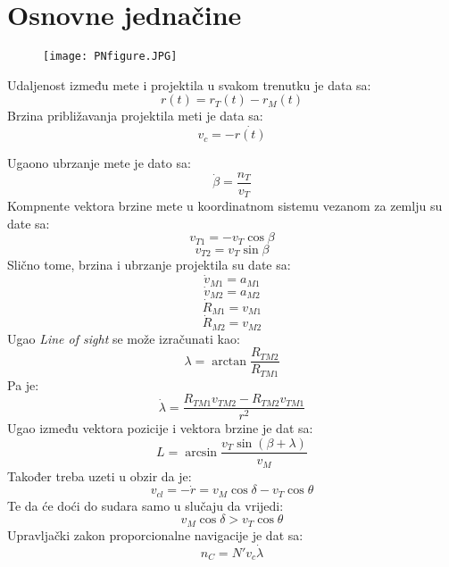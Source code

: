 
\section{Osnovne jednačine}

\begin{figure}[h!]
    \centering
    \texttt{[image: PNfigure.JPG]}
\end{figure}

Udaljenost između mete i projektila u svakom trenutku je data sa:
\begin{equation}
    r(t)=r_T(t)-r_M(t)
\end{equation}
Brzina približavanja projektila meti je data sa: 
\begin{equation}
    v_c=-\dot{r(t)}
\end{equation}

Ugaono ubrzanje mete je dato sa:
\begin{equation}
    \dot{\beta}=\frac{n_T}{v_T}
\end{equation}
Kompnente vektora brzine mete u koordinatnom sistemu vezanom za zemlju su date sa:
\begin{equation}
    v_{T1}=-v_T\cos{\beta}
\end{equation}
\begin{equation}
    v_{T2}=v_T\sin{\beta}
\end{equation}
Slično tome, brzina i ubrzanje projektila su date sa:
\begin{equation}
    \dot{v}_{M1}=a_{M1}
\end{equation}
\begin{equation}
    \dot{v}_{M2}=a_{M2}
\end{equation}
\begin{equation}
    \dot{R}_{M1}=v_{M1}
\end{equation}
\begin{equation}
    \dot{R}_{M2}=v_{M2}
\end{equation}
Ugao \textit{Line of sight} se može izračunati kao:
\begin{equation}
    \lambda = \arctan{\frac{R_{TM2}}{R_{TM1}}}
\end{equation}
Pa je: 
\begin{equation}
    \dot{\lambda}=\frac{R_{TM1}v_{TM2}-R_{TM2}v_{TM1}}{r^2}
\end{equation}
Ugao između vektora pozicije i vektora brzine je dat sa:
\begin{equation}
    L=\arcsin{\frac{v_T\sin{(\beta+\lambda)}}{v_M}}
\end{equation}
Također treba uzeti u obzir da je:
\begin{equation}
    v_{cl}=-\dot{r}=v_M\cos\delta - v_T\cos\theta
\end{equation}
Te da će doći do sudara samo u slučaju da vrijedi: 
\begin{equation}
    v_M\cos\delta > v_T\cos\theta
\end{equation}
Upravljački zakon proporcionalne navigacije je dat sa:
\begin{equation}
    n_C=N'v_c\dot{\lambda}
\end{equation}

